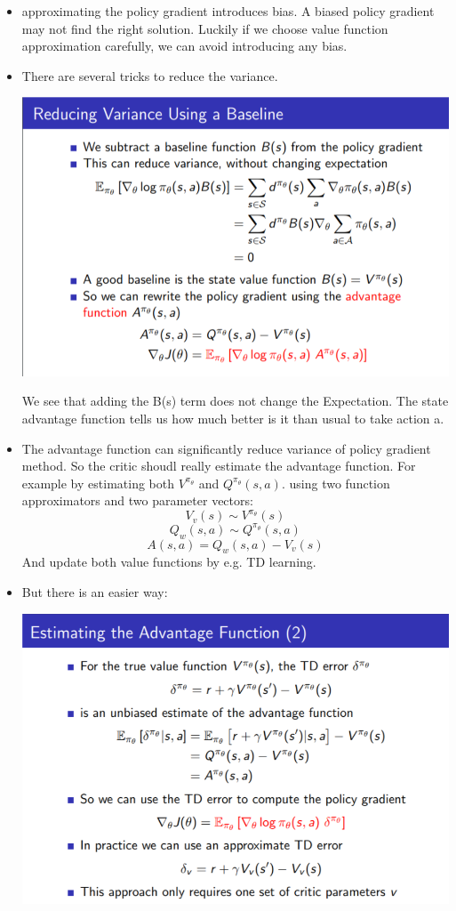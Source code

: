 \documentclass[a4paper]{article}
\begin{document}
\begin{itemize}
    \item approximating the policy gradient introduces bias. A biased policy gradient may not find the right solution. Luckily if we choose value function approximation carefully, we can avoid introducing any bias.  
    \item There are several tricks to reduce the variance. 
      \begin{center}
    \includegraphics[width = \textwidth]{images/variance.png}
    \end{center}
    We see that adding the B(s) term does not change the Expectation. The state advantage function tells us how much better is it than usual to take action a. 
    \item The advantage function can significantly reduce variance of policy gradient method. So the critic shoudl really estimate the advantage function. For example by estimating both $V^{\pi_{\theta}} $ and $Q^{\pi_{\theta}}(s,a)$. using two function approximators and two parameter vectors: $$V_v(s) \sim V^{\pi_{\theta}}(s)$$
    $$Q_w(s,a) \sim Q^{\pi_{\theta}}(s,a)$$
    $$A(s,a) = Q_w(s,a) - V_v(s)$$ 
    And update both value functions by e.g. TD learning. 
    \item But there is an easier way: 
      \begin{center}
    \includegraphics[width = \textwidth]{images/advantage.png}

\end{center}
\end{itemize}
\end{document}

